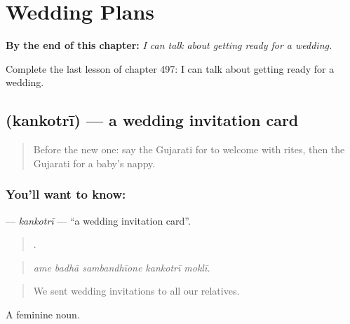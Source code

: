 
\chapter{Wedding Plans}
\label{ch:gu-wedding-plans}

\begin{chapteropening}
\textbf{By the end of this chapter:} \emph{I can talk about getting ready for a wedding.}

Complete the last lesson of chapter 497: I can talk about getting ready for a wedding.
\end{chapteropening}

\section[\texorpdfstring{\gu{કંકોતરી} (kankotrī)}{કંકોતરી (kankotrī)}]{ (kankotrī) — a wedding invitation card}

\label{lesson:GU-C497-kankotri}



\begin{quote}
Before the new one: say the Gujarati for to welcome with rites, then the Gujarati for a baby's nappy.
\end{quote}

\subsection*{You'll want to know: }
\textbf{} — \emph{kankotrī} — \textquotedblleft{}a wedding invitation card\textquotedblright{}.

\begin{quote}
    .
\end{quote}

\begin{quote}
\emph{ame badhā sambandhīone kankotrī moklī.}
\end{quote}

\begin{quote}
We sent wedding invitations to all our relatives.
\end{quote}

A feminine noun.


